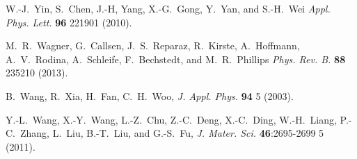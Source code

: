 \documentclass[22pt]{article} %
\begin{document}
\begin{thebibliography}{1}
W.-J.~Yin, S.~Chen, J.-H, Yang, X.-G.~Gong, Y.~Yan, and S.-H.~Wei
\newblock \emph{Appl. Phys. Lett.} \textbf{96} 221901 (2010).

M.~R.~Wagner, G.~Callsen, J.~S.~Reparaz, R.~Kirste, A.~Hoffmann, A.~V.~Rodina, A.~Schleife, F.~Bechstedt, and M.~R.~Phillips
\newblock \emph{Phys. Rev. B.} \textbf{88} 235210 (2013).

B.~Wang, R.~Xia, H.~Fan, C.~H.~Woo,
\newblock \emph{J. Appl. Phys.} \textbf{94} 5 (2003).

Y.-L.~Wang, X.-Y.~Wang, L.-Z.~Chu, Z.-C.~Deng, X.-C.~Ding, W.-H.~Liang, P.-C.~Zhang, L.~Liu, B.-T.~Liu, and G.-S.~Fu,
\newblock \emph{J. Mater. Sci.} \textbf{46}:2695-2699 5 (2011).

\end{thebibliography}


\end{document}
